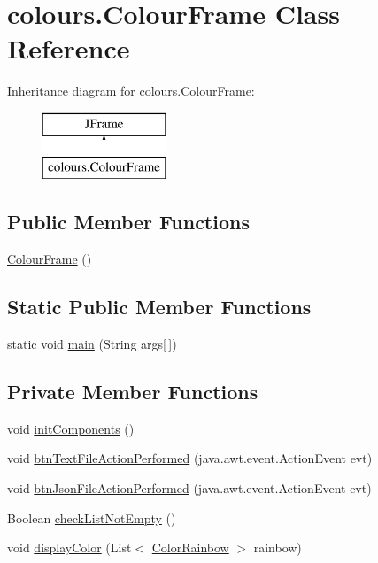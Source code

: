 \hypertarget{classcolours_1_1_colour_frame}{}\section{colours.\+Colour\+Frame Class Reference}
\label{classcolours_1_1_colour_frame}
Inheritance diagram for colours.\+Colour\+Frame\+:\begin{figure}[H]
\begin{center}
\leavevmode
\includegraphics[height=2.000000cm]{classcolours_1_1_colour_frame}
\end{center}
\end{figure}
\subsection*{Public Member Functions}
\begin{DoxyCompactItemize}
\item 
\hyperlink{classcolours_1_1_colour_frame_ab7b3858b7fb97ff26bf7534c1767270c}{Colour\+Frame} ()
\end{DoxyCompactItemize}
\subsection*{Static Public Member Functions}
\begin{DoxyCompactItemize}
\item 
static void \hyperlink{classcolours_1_1_colour_frame_a7f890970aa168fcb9791f1de589a5c2c}{main} (String args\mbox{[}$\,$\mbox{]})
\end{DoxyCompactItemize}
\subsection*{Private Member Functions}
\begin{DoxyCompactItemize}
\item 
void \hyperlink{classcolours_1_1_colour_frame_aa654076ec5e365557e85b7ba8e3dae47}{init\+Components} ()
\item 
void \hyperlink{classcolours_1_1_colour_frame_ad1dd5e41e9cc42f135ff3c1b343ff761}{btn\+Text\+File\+Action\+Performed} (java.\+awt.\+event.\+Action\+Event evt)
\item 
void \hyperlink{classcolours_1_1_colour_frame_ab959355834a40b99a18e05e5121417c5}{btn\+Json\+File\+Action\+Performed} (java.\+awt.\+event.\+Action\+Event evt)
\item 
Boolean \hyperlink{classcolours_1_1_colour_frame_a693e820f5c6ea43ce0a862bd751f42c3}{check\+List\+Not\+Empty} ()
\item 
void \hyperlink{classcolours_1_1_colour_frame_a97c8597f65a97de8993a1ab05d39dd44}{display\+Color} (List$<$ \hyperlink{classcolours_1_1_color_rainbow}{Color\+Rainbow} $>$ rainbow)
\end{DoxyCompactItemize}
